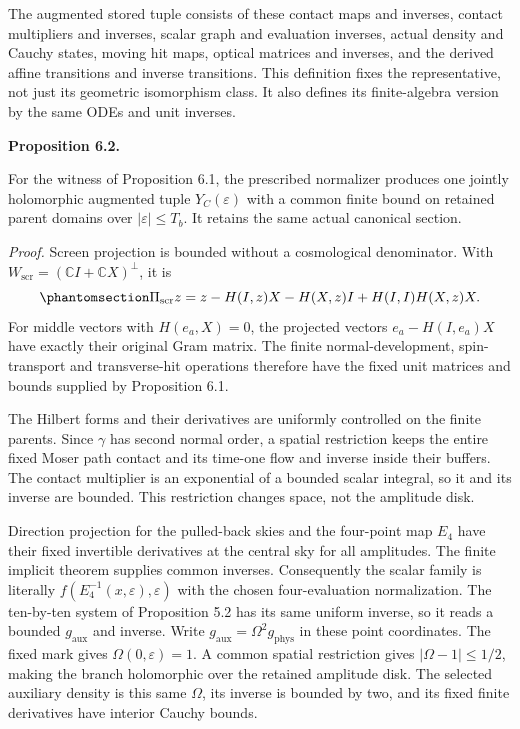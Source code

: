 \documentclass[
  english,
  11pt,
  reqno]{amsart}
\makeatletter
\newcommand{\pandocstatementheading}[1]{%
  \par\addpenalty{\@beginparpenalty}%
  \addvspace{.5\baselineskip plus .2\baselineskip minus .2\baselineskip}%
  {\normalfont\bfseries #1\par}%
  \nobreak\@afterindenttrue\@afterheading
}
\makeatother
\begin{document}
The augmented stored tuple consists of these contact maps and inverses,
contact multipliers and inverses, scalar graph and evaluation inverses,
actual density and Cauchy states, moving hit maps, optical matrices and
inverses, and the derived affine transitions and inverse transitions.
This definition fixes the representative, not just its geometric
isomorphism class. It also defines its finite-algebra version by the
same ODEs and unit inverses.

\pandocstatementheading{\protect{}\label{prop:gg-bounded-prescribed-normalizer}Proposition 6.2.}

For the witness of Proposition 6.1, the prescribed normalizer produces
one jointly holomorphic augmented tuple \(Y_C(\varepsilon)\) with a
common finite bound on retained parent domains over
\(|\varepsilon|\le T_b\). It retains the same actual canonical section.

\emph{Proof.} Screen projection is bounded without a cosmological
denominator. With \(W_{\mathrm{scr}}=(\mathbb CI+\mathbb CX)^\perp\), it
is
\begin{equation}\protect\phantomsection\label{eq:gg-bounded-screen-projection}{
 \Pi_{\mathrm{scr}}z=z-H(I,z)X-H(X,z)I+H(I,I)H(X,z)X .
}\end{equation} For middle vectors with \(H(e_a,X)=0\), the projected
vectors \(e_a-H(I,e_a)X\) have exactly their original Gram matrix. The
finite normal-development, spin-transport and transverse-hit operations
therefore have the fixed unit matrices and bounds supplied by
Proposition 6.1.

The Hilbert forms and their derivatives are uniformly controlled on the
finite parents. Since \(\gamma\) has second normal order, a spatial
restriction keeps the entire fixed Moser path contact and its time-one
flow and inverse inside their buffers. The contact multiplier is an
exponential of a bounded scalar integral, so it and its inverse are
bounded. This restriction changes space, not the amplitude disk.

Direction projection for the pulled-back skies and the four-point map
\(E_4\) have their fixed invertible derivatives at the central sky for
all amplitudes. The finite implicit theorem supplies common inverses.
Consequently the scalar family is literally
\(f(E_4^{-1}(x,\varepsilon),\varepsilon)\) with the chosen
four-evaluation normalization. The ten-by-ten system of Proposition 5.2
has its same uniform inverse, so it reads a bounded \(g_{\mathrm{aux}}\)
and inverse. Write \(g_{\mathrm{aux}}=\Omega^2g_{\mathrm{phys}}\) in
these point coordinates. The fixed mark gives
\(\Omega(0,\varepsilon)=1\). A common spatial restriction gives
\(|\Omega-1|\le1/2\), making the branch holomorphic over the retained
amplitude disk. The selected auxiliary density is this same \(\Omega\),
its inverse is bounded by two, and its fixed finite derivatives have
interior Cauchy bounds.
\end{document}
